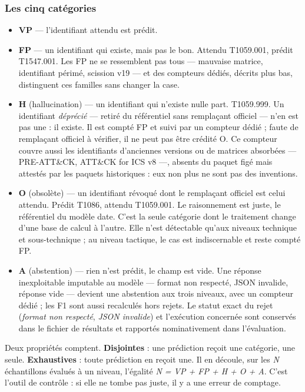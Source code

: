\subsubsection{Les cinq catégories}\label{sec:2-2}
\begin{itemize}
\item
  \textbf{VP} --- l'identifiant attendu est prédit.
\item
  \textbf{FP} --- un identifiant qui existe, mais pas le bon. Attendu T1059.001, prédit T1547.001. Les FP ne se ressemblent pas tous --- mauvaise matrice, identifiant périmé, scission v19 --- et des compteurs dédiés, décrits plus bas, distinguent ces familles sans changer la case.
\item
  \textbf{H} (hallucination) --- un identifiant qui n'existe nulle part. T1059.999. Un identifiant \emph{déprécié} --- retiré du référentiel sans remplaçant officiel --- n'en est pas une : il existe. Il est compté FP et suivi par un compteur dédié ; faute de remplaçant officiel à vérifier, il ne peut pas être crédité O. Ce compteur couvre aussi les identifiants d'anciennes versions ou de matrices absorbées --- PRE-ATT\&CK, ATT\&CK for ICS v8 ---, absents du paquet figé mais attestés par les paquets historiques : eux non plus ne sont pas des inventions.
\item
  \textbf{O} (obsolète) --- un identifiant révoqué dont le remplaçant officiel est celui attendu. Prédit T1086, attendu T1059.001. Le raisonnement est juste, le référentiel du modèle date. C'est la seule catégorie dont le traitement change d'une base de calcul à l'autre. Elle n'est détectable qu'aux niveaux technique et sous-technique ; au niveau tactique, le cas est indiscernable et reste compté FP.
\item
  \textbf{A} (abstention) --- rien n'est prédit, le champ est vide. Une réponse inexploitable imputable au modèle --- format non respecté, JSON invalide, réponse vide --- devient une abstention aux trois niveaux, avec un compteur dédié ; les F1 sont aussi recalculés hors rejets. Le statut exact du rejet (\emph{format non respecté}, \emph{JSON invalide}) et l'exécution concernée sont conservés dans le fichier de résultats et rapportés nominativement dans l'évaluation.
\end{itemize}

Deux propriétés comptent. \textbf{Disjointes} : une prédiction reçoit une catégorie, une seule. \textbf{Exhaustives} : toute prédiction en reçoit une. Il en découle, sur les \emph{N} échantillons évalués à un niveau, l'égalité \emph{N = VP + FP + H + O + A}. C'est l'outil de contrôle : si elle ne tombe pas juste, il y a une erreur de comptage.

